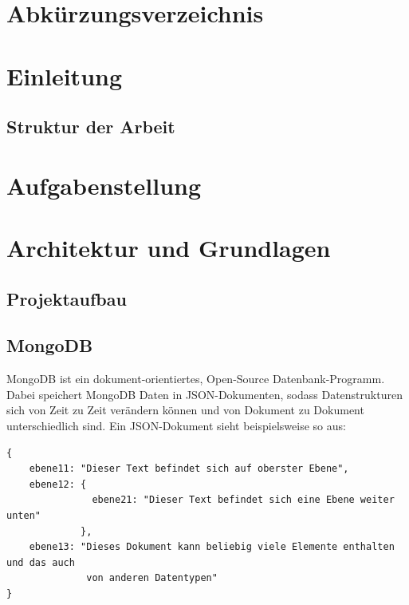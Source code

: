 \documentclass[12pt,a4paper]{report}
\begin{document}
\newpage
\chapter*{Abkürzungsverzeichnis}
\begin{acronym}[slmtA]
\end{acronym}  


\newpage
\tableofcontents

\newpage
\listoffigures

\newpage
\listoftables

\newpage
\chapter{Einleitung}

\section*{Struktur der Arbeit}

\newpage
\chapter{Aufgabenstellung}

\newpage
\chapter{Architektur und Grundlagen}

\section{Projektaufbau}

\section{MongoDB}
MongoDB ist ein dokument-orientiertes, Open-Source Datenbank-Programm. Dabei speichert MongoDB Daten in JSON-Dokumenten, sodass Datenstrukturen sich von Zeit zu Zeit verändern können und von Dokument zu Dokument unterschiedlich sind. Ein JSON-Dokument sieht beispielsweise so aus:
\begin{verbatim}
{
	ebene11: "Dieser Text befindet sich auf oberster Ebene",
	ebene12: { 
	           ebene21: "Dieser Text befindet sich eine Ebene weiter unten"
	         },
	ebene13: "Dieses Dokument kann beliebig viele Elemente enthalten und das auch
	          von anderen Datentypen"
}
\end{verbatim}
\end{document}
